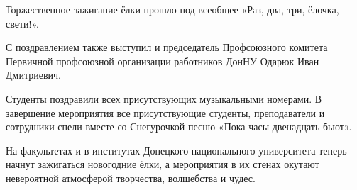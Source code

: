
Торжественное зажигание ёлки прошло под всеобщее «Раз, два, три, ёлочка,
свети!».

С поздравлением также выступил и председатель Профсоюзного комитета Первичной
профсоюзной организации работников ДонНУ Одарюк Иван Дмитриевич.


Студенты поздравили всех присутствующих музыкальными номерами. В завершение
мероприятия все присутствующие студенты, преподаватели и сотрудники спели
вместе со Снегурочкой песню «Пока часы двенадцать бьют».

На факультетах и в институтах Донецкого национального университета теперь
начнут зажигаться новогодние ёлки, а мероприятия в их стенах окутают
невероятной атмосферой творчества, волшебства и чудес.
